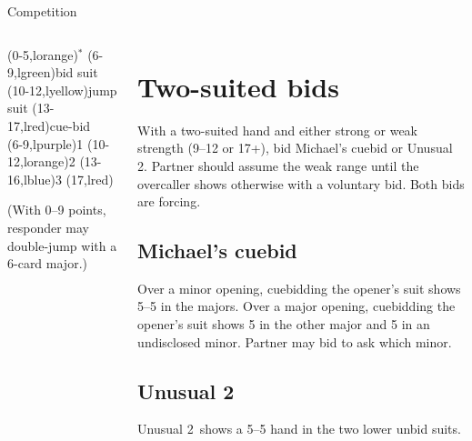 \begin{sheet}{Competition}
\begin{columns}{2}
\begin{column}
{\noindent
\begin{ptable}
  \bid(0-5,lorange){\pass$^*$}
  \bid(6-9,lgreen){bid suit}
  \bid(10-12,lyellow){jump suit}
  \bid(13-17,lred){cue-bid}\\
  \bid(6-9,lpurple){1\nt}
  \bid(10-12,lorange){2\nt}
  \bid(13-16,lblue){3\nt}
  \bid*(17,lred){}\\
\end{ptable}}
\vskip8pt\noindent
(With 0--9 points, responder may double-jump with a 6-card major.)
\end{column}

\begin{column}
\section{Two-suited bids}
With a two-suited hand and either strong or weak strength (9--12 or 17+),
bid Michael's cuebid or Unusual 2\nt.  Partner should assume the weak
range until the overcaller shows otherwise with a voluntary bid.  Both
bids are forcing.

\subsection{Michael's cuebid}
Over a minor opening, cuebidding the opener's suit shows 5--5 in the majors.
Over a major opening, cuebidding the opener's suit shows 5 in the other major
and 5 in an undisclosed minor.  Partner may bid \nt to ask which minor.

\subsection{Unusual 2\nt}
Unusual 2\nt\ shows a 5--5 hand in the two lower unbid suits.
\end{column}
\end{columns}

\vskip-8pt

\end{sheet}
